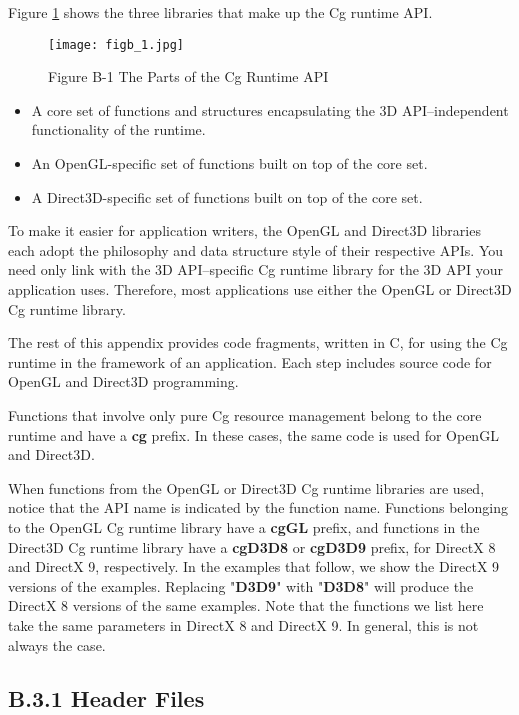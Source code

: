 \documentclass[../main.tex]{subfiles}
\begin{document}
Figure \ref{fig:B-1} shows the three libraries that make up the Cg runtime API.

\begin{figure}
    \centering
    \texttt{[image: figb\_1.jpg]}
    \caption{Figure B-1 The Parts of the Cg Runtime API}
    \label{fig:B-1}
\end{figure}

\begin{itemize}
\item A core set of functions and structures encapsulating the 3D API–independent functionality of the runtime.
\item An OpenGL-specific set of functions built on top of the core set.
\item A Direct3D-specific set of functions built on top of the core set.
\end{itemize}

To make it easier for application writers, the OpenGL and Direct3D libraries each adopt the philosophy and data structure style of their respective APIs. You need only link with the 3D API–specific Cg runtime library for the 3D API your application uses. Therefore, most applications use either the OpenGL or Direct3D Cg runtime library.

The rest of this appendix provides code fragments, written in C, for using the Cg runtime in the framework of an application. Each step includes source code for OpenGL and Direct3D programming.

Functions that involve only pure Cg resource management belong to the core runtime and have a \textbf{cg} prefix. In these cases, the same code is used for OpenGL and Direct3D.

When functions from the OpenGL or Direct3D Cg runtime libraries are used, notice that the API name is indicated by the function name. Functions belonging to the OpenGL Cg runtime library have a \textbf{cgGL} prefix, and functions in the Direct3D Cg runtime library have a \textbf{cgD3D8} or \textbf{cgD3D9} prefix, for DirectX 8 and DirectX 9, respectively. In the examples that follow, we show the DirectX 9 versions of the examples. Replacing "\textbf{D3D9}" with "\textbf{D3D8}" will produce the DirectX 8 versions of the same examples. Note that the functions we list here take the same parameters in DirectX 8 and DirectX 9. In general, this is not always the case.

\subsection{B.3.1 Header Files}
\end{document}
